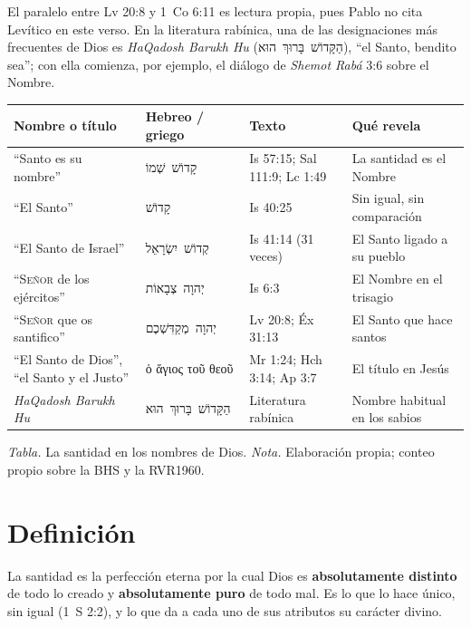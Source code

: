 \documentclass[11pt,letterpaper]{article}
\newcommand{\heb}[1]{\mbox{\foreignlanguage{hebrew}{#1}}}
\newcommand{\grc}[1]{\foreignlanguage{ancientgreek}{#1}}
\newcommand{\SENOR}{\textsc{Señor}}
\newcommand{\destacar}[1]{\textbf{\textcolor{azul}{#1}}}
\begin{document}
\begin{nota}[Precisión]
El paralelo entre Lv 20:8 y 1~Co 6:11 es lectura propia, pues Pablo no cita Levítico en este verso. En la literatura rabínica, una de las designaciones más frecuentes de Dios es \emph{HaQadosh Barukh Hu} (\heb{הַקָּדוֹשׁ בָּרוּךְ הוּא}), ``el Santo, bendito sea''; con ella comienza, por ejemplo, el diálogo de \emph{Shemot Rabá} 3:6 sobre el Nombre.
\end{nota}

\begin{center}
\small\renewcommand{\arraystretch}{1.2}
\begin{tabular}{@{}L{4.2cm}L{3.6cm}L{3.0cm}L{4.6cm}@{}}
\toprule
\textbf{Nombre o título} & \textbf{Hebreo / griego} & \textbf{Texto} & \textbf{Qué revela} \\ \midrule
``Santo es su nombre'' & \heb{קָדוֹשׁ שְׁמוֹ} & Is 57:15; Sal 111:9; Lc 1:49 & La santidad es el Nombre \\
``El Santo'' & \heb{קָדוֹשׁ} & Is 40:25 & Sin igual, sin comparación \\
``El Santo de Israel'' & \heb{קְדוֹשׁ יִשְׂרָאֵל} & Is 41:14 (31 veces) & El Santo ligado a su pueblo \\
``\SENOR{} de los ejércitos'' & \heb{יְהוָה צְבָאוֹת} & Is 6:3 & El Nombre en el trisagio \\
``\SENOR{} que os santifico'' & \heb{יְהוָה מְקַדִּשְׁכֶם} & Lv 20:8; Éx 31:13 & El Santo que hace santos \\
``El Santo de Dios'', ``el Santo y el Justo'' & \grc{ὁ ἅγιος τοῦ θεοῦ} & Mr 1:24; Hch 3:14; Ap 3:7 & El título en Jesús \\
\emph{HaQadosh Barukh Hu} & \heb{הַקָּדוֹשׁ בָּרוּךְ הוּא} & Literatura rabínica & Nombre habitual en los sabios \\ \bottomrule
\end{tabular}\par\smallskip
{\footnotesize\color{gris}\textit{Tabla.} La santidad en los nombres de Dios. \textit{Nota.} Elaboración propia; conteo propio sobre la BHS y la RVR1960.}
\end{center}

\section{Definición}

\begin{tcolorbox}[colback=papiro,colframe=azul,boxrule=1pt,arc=3pt,fonttitle=\bfseries,title=La santidad de Dios]
La santidad es la perfección eterna por la cual Dios es \destacar{absolutamente distinto} de todo lo creado y \destacar{absolutamente puro} de todo mal. Es lo que lo hace único, sin igual (1~S 2:2), y lo que da a cada uno de sus atributos su carácter divino.
\end{tcolorbox}
\end{document}
